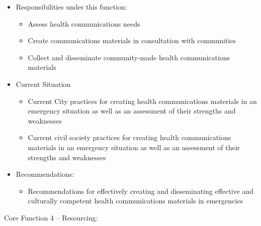 \documentclass[
  letterpaper,
  DIV=11,
  numbers=noendperiod,
  oneside]{scrreprt}
\providecommand{\tightlist}{%
  \setlength{\itemsep}{0pt}\setlength{\parskip}{0pt}}\usepackage{longtable,booktabs,array}
\begin{document}
\begin{itemize}
\item
  Responsibilities under this function:

  \begin{itemize}
  \item
    Assess health communications needs
  \item
    Create communications materials in consultation with communities
  \item
    Collect and disseminate community-made health communications
    materials
  \end{itemize}
\item
  Current Situation

  \begin{itemize}
  \item
    Current City practices for creating health communications materials
    in an emergency situation as well as an assessment of their
    strengths and weaknesses
  \item
    Current civil society practices for creating health communications
    materials in an emergency situation as well as an assessment of
    their strengths and weaknesses
  \end{itemize}
\item
  Recommendations:

  \begin{itemize}
  \tightlist
  \item
    Recommendations for effectively creating and disseminating effective
    and culturally competent health communications materials in
    emergencies
  \end{itemize}
\end{itemize}

\hfill\break

Core Function 4 -- Resourcing:
\end{document}
